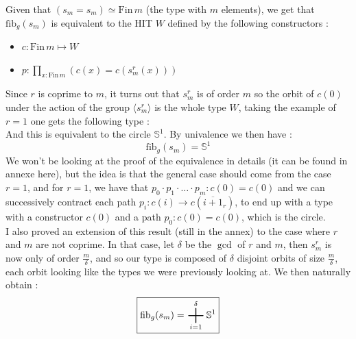 \documentclass{report}
\DeclareMathOperator*{\bigplus}{\scalerel*{+}{\sum}}
\begin{document}
Given that $(s_m = s_m) \simeq \mathrm{Fin} \hspace{2pt} m$ (the type with $m$ elements), we get that $\mathrm{fib}_g(s_m)$ is equivalent to the HIT $W$ defined by the following constructors : 
\begin{itemize}
  \item $c : \mathrm{Fin} \hspace{2pt} m \mapsto W$
  \item $ p : \prod_{x : \mathrm{Fin}\hspace{2pt} m} (c(x) = c(s_m^r(x)))$
\end{itemize}
Since $r$ is coprime to $m$, it turns out that $s_m^r$ is of order $m$ so the orbit of $c(0)$ under the action of the group $\langle s_m^r \rangle$ is the whole type $W$, taking the example of $r=1$ one gets the following type : \\
And this is equivalent to the circle $\mathbb{S}^1$. By univalence we then have :
$$\boxed{\mathrm{fib}_g(s_m) = \mathbb{S}^1}$$
We won't be looking at the proof of the equivalence in details (it can be found in annexe here), but the idea is that the general case should come from the case $r=1$, and for $r=1$, we have that $p_0 \cdot p_1 \cdot \ldots \cdot p_m : c(0)=c(0)$ and we can successively contract each path $p_i : c(i)\rightarrow c(\overline{i+1}_r)$, to end up with a type with a constructor $c(0)$ and a path $p_0 : c(0) = c(0)$, which is the circle. \\
I also proved an extension of this result (still in the annex) to the case where $r$ and $m$ are not coprime. In that case, let $\delta$ be the $\gcd$ of $r$ and $m$, then $s_m^r$ is now only of order $\frac m{\delta}$, and so our type is composed of $\delta$ disjoint orbits of size $\frac m{\delta}$, each orbit looking like the types we were previously looking at. We then naturally obtain : 
$$\boxed{\mathrm{fib}_g(s_m) = \bigplus_{i=1}^{\delta} \mathbb{S}^1}$$
\printbibliography
\end{document}
